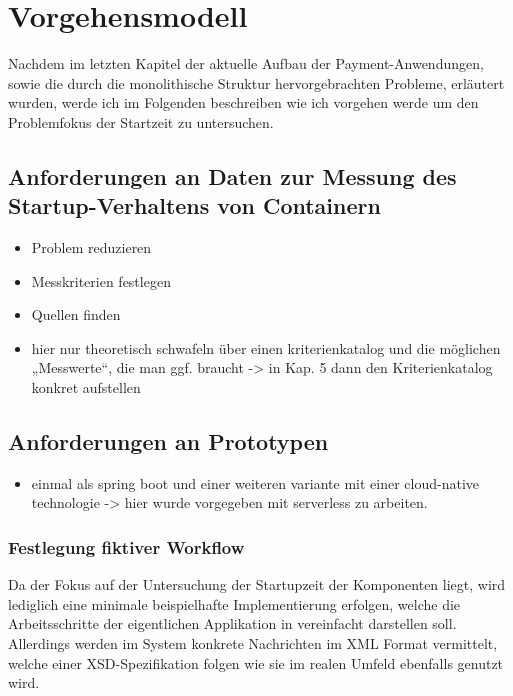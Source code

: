 \chapter{Vorgehensmodell}

Nachdem im letzten Kapitel der aktuelle Aufbau der Payment-Anwendungen, sowie die durch die monolithische Struktur hervorgebrachten Probleme, erläutert wurden, werde ich im Folgenden beschreiben wie ich vorgehen werde um den Problemfokus der Startzeit zu untersuchen.

\section{Anforderungen an Daten zur Messung des Startup-Verhaltens von Containern}
\begin{itemize}
  \item Problem reduzieren
  \item Messkriterien festlegen
  \item Quellen finden
  \item hier nur theoretisch schwafeln über einen kriterienkatalog und die möglichen „Messwerte“, die man ggf. braucht -> in Kap. 5 dann den Kriterienkatalog konkret aufstellen
\end{itemize}




\section{Anforderungen an Prototypen}
\begin{itemize}
  \item einmal als spring boot und einer weiteren variante mit einer cloud-native technologie -> hier wurde vorgegeben mit serverless zu arbeiten.
\end{itemize}

\subsection{Festlegung fiktiver Workflow}
Da der Fokus auf der Untersuchung der Startupzeit der Komponenten liegt, wird lediglich eine minimale beispielhafte Implementierung erfolgen, welche die Arbeitsschritte der eigentlichen Applikation in vereinfacht darstellen soll. Allerdings werden im System konkrete Nachrichten im XML Format vermittelt, welche einer XSD-Spezifikation folgen wie sie im realen Umfeld ebenfalls genutzt wird. 


